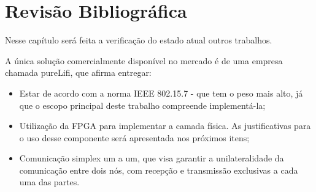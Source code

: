 	\chapter{Revisão Bibliográfica}\label{cap-revisao-bibliografica}
	
	Nesse capítulo será feita a verificação do estado atual outros trabalhos.
	
	A única solução comercialmente disponível no mercado é de uma empresa chamada pureLifi, que afirma entregar:

	\begin{itemize}
		\item Estar de acordo com a norma IEEE 802.15.7 - que tem o peso mais alto, já que o escopo principal deste trabalho compreende implementá-la;
		\item Utilização da FPGA para implementar a camada física. As justificativas para o uso desse componente será apresentada nos próximos itens;
		\item Comunicação simplex um a um, que visa garantir a unilateralidade da comunicação entre dois nós, com recepção e transmissão exclusivas a cada uma das partes.
	\end{itemize}
